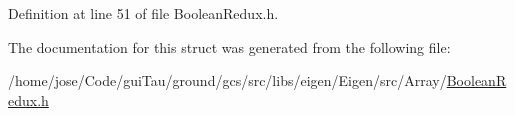 Definition at line 51 of file Boolean\-Redux.\-h.



The documentation for this struct was generated from the following file\-:\begin{DoxyCompactItemize}
\item 
/home/jose/\-Code/gui\-Tau/ground/gcs/src/libs/eigen/\-Eigen/src/\-Array/\hyperlink{_boolean_redux_8h}{Boolean\-Redux.\-h}\end{DoxyCompactItemize}
